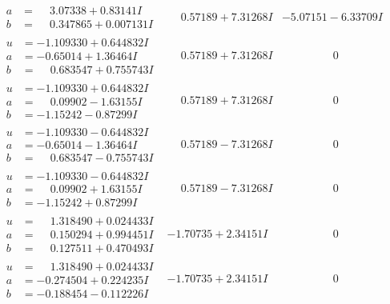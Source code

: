 \documentclass[1p]{elsarticle_modified}
\theoremstyle{definition}
\begin{document}
$$\begin{array}{c|c|c}
\begin{aligned}
a &= \phantom{-}3.07338 + 0.83141 I \\
b &= \phantom{-}0.347865 + 0.007131 I\end{aligned}
 & \phantom{-}0.57189 + 7.31268 I & -5.07151 - 6.33709 I \\ \hline\begin{aligned}
u &= -1.109330 + 0.644832 I \\
a &= -0.65014 + 1.36464 I \\
b &= \phantom{-}0.683547 + 0.755743 I\end{aligned}
 & \phantom{-}0.57189 + 7.31268 I & \phantom{-0.000000 } 0 \\ \hline\begin{aligned}
u &= -1.109330 + 0.644832 I \\
a &= \phantom{-}0.09902 - 1.63155 I \\
b &= -1.15242 - 0.87299 I\end{aligned}
 & \phantom{-}0.57189 + 7.31268 I & \phantom{-0.000000 } 0 \\ \hline\begin{aligned}
u &= -1.109330 - 0.644832 I \\
a &= -0.65014 - 1.36464 I \\
b &= \phantom{-}0.683547 - 0.755743 I\end{aligned}
 & \phantom{-}0.57189 - 7.31268 I & \phantom{-0.000000 } 0 \\ \hline\begin{aligned}
u &= -1.109330 - 0.644832 I \\
a &= \phantom{-}0.09902 + 1.63155 I \\
b &= -1.15242 + 0.87299 I\end{aligned}
 & \phantom{-}0.57189 - 7.31268 I & \phantom{-0.000000 } 0 \\ \hline\begin{aligned}
u &= \phantom{-}1.318490 + 0.024433 I \\
a &= \phantom{-}0.150294 + 0.994451 I \\
b &= \phantom{-}0.127511 + 0.470493 I\end{aligned}
 & -1.70735 + 2.34151 I & \phantom{-0.000000 } 0 \\ \hline\begin{aligned}
u &= \phantom{-}1.318490 + 0.024433 I \\
a &= -0.274504 + 0.224235 I \\
b &= -0.188454 - 0.112226 I\end{aligned}
 & -1.70735 + 2.34151 I & \phantom{-0.000000 } 0 \\ \hline\begin{aligned}

\end{aligned}
\end{array}$$
\end{document}
